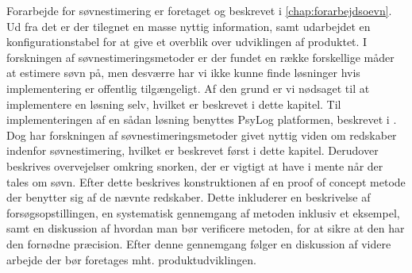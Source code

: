 Forarbejde for søvnestimering er foretaget og beskrevet i \cref{chap:forarbejdsoevn}.
Ud fra det er der tilegnet en masse nyttig information, samt udarbejdet en konfigurationstabel for at give et overblik over udviklingen af produktet.
I forskningen af søvnestimeringsmetoder er der fundet en række forskellige måder at estimere søvn på, men desværre har vi ikke kunne finde løsninger hvis implementering er offentlig tilgængeligt.
Af den grund er vi nødsaget til at implementere en løsning selv, hvilket er beskrevet i dette kapitel.
Til implementeringen af en sådan løsning benyttes PsyLog platformen, beskrevet i \citet{misc:faellesrapp}.
Dog har forskningen af søvnestimeringsmetoder givet nyttig viden om redskaber indenfor søvnestimering, hvilket er beskrevet først i dette kapitel.
Derudover beskrives overvejelser omkring snorken, der er vigtigt at have i mente når der tales om søvn.
Efter dette beskrives konstruktionen af en proof of concept metode der benytter sig af de nævnte redskaber.
Dette inkluderer en beskrivelse af forsøgsopstillingen, en systematisk gennemgang af metoden inklusiv et eksempel, samt en diskussion af hvordan man bør verificere metoden, for at sikre at den har den fornødne præcision.
Efter denne gennemgang følger en diskussion af videre arbejde der bør foretages mht. produktudviklingen.







